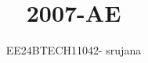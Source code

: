 \documentclass[journal]{IEEEtran}
\begin{document}

\vspace{3cm}

\title{2007-AE}
\author{EE24BTECH11042- srujana}
{\let\newpage\relax\maketitle}

\renewcommand{\thefigure}{\theenumi}
\renewcommand{\thetable}{\theenumi}
\setlength{\intextsep}{10pt} %


\renewcommand{\thetable}{\theenumi}
\end{document}
